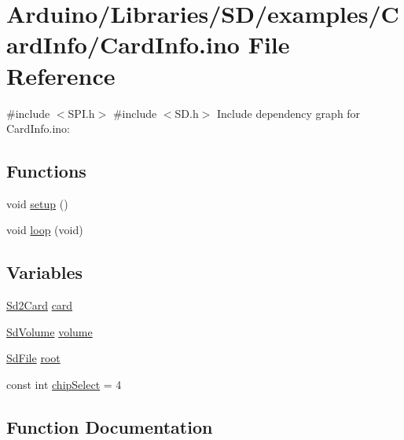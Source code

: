 \hypertarget{_card_info_8ino}{}\section{Arduino/\+Libraries/\+S\+D/examples/\+Card\+Info/\+Card\+Info.ino File Reference}
\label{_card_info_8ino}
{\ttfamily \#include $<$S\+P\+I.\+h$>$}\newline
{\ttfamily \#include $<$S\+D.\+h$>$}\newline
Include dependency graph for Card\+Info.\+ino\+:
\subsection*{Functions}
\begin{DoxyCompactItemize}
\item 
void \hyperlink{_card_info_8ino_a4fc01d736fe50cf5b977f755b675f11d}{setup} ()
\item 
void \hyperlink{_card_info_8ino_a0b33edabd7f1c4e4a0bf32c67269be2f}{loop} (void)
\end{DoxyCompactItemize}
\subsection*{Variables}
\begin{DoxyCompactItemize}
\item 
\hyperlink{class_sd2_card}{Sd2\+Card} \hyperlink{_card_info_8ino_aeeb69ee529b0f58271aa28e823825f77}{card}
\item 
\hyperlink{class_sd_volume}{Sd\+Volume} \hyperlink{_card_info_8ino_a89ea83df4812c74a5c11a988458471c8}{volume}
\item 
\hyperlink{class_sd_file}{Sd\+File} \hyperlink{_card_info_8ino_a04284a6711f66caf6c351007f90d935e}{root}
\item 
const int \hyperlink{_card_info_8ino_a266db0f4dbdfbc06ea34c96f66bebed3}{chip\+Select} = 4
\end{DoxyCompactItemize}


\subsection{Function Documentation}
\mbox{\label{_card_info_8ino_a0b33edabd7f1c4e4a0bf32c67269be2f}} 
